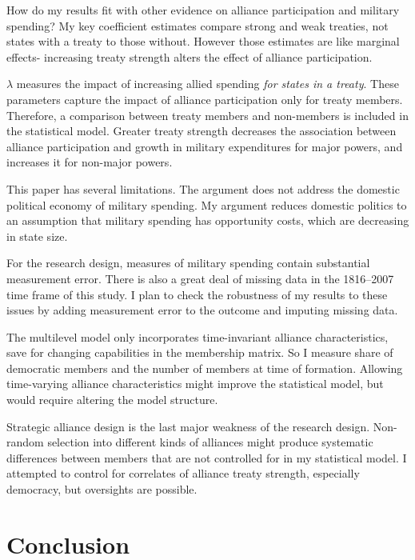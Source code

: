 \documentclass[12pt]{article}
\begin{document}
How do my results fit with other evidence on alliance participation and military spending? 
My key coefficient estimates compare strong and weak treaties, not states with a treaty to those without. 
However those estimates are like marginal effects- increasing treaty strength alters the effect of alliance participation.

 
$\lambda$ measures the impact of increasing allied spending \textit{for states in a treaty}. 
These parameters capture the impact of alliance participation only for treaty members. 
Therefore, a comparison between treaty members and non-members is included in the statistical model. 
Greater treaty strength decreases the association between alliance participation and growth in military expenditures for major powers, and increases it for non-major powers. 


This paper has several limitations.
The argument does not address the domestic political economy of military spending. 
My argument reduces domestic politics to an assumption that military spending has opportunity costs, which are decreasing in state size. 


For the research design, measures of military spending contain substantial measurement error. 
There is also a great deal of missing data in the 1816--2007 time frame of this study. 
I plan to check the robustness of my results to these issues by adding measurement error to the outcome and imputing missing data.


The multilevel model only incorporates time-invariant alliance characteristics, save for changing capabilities in the membership matrix. 
So I measure share of democratic members and the number of members at time of formation. 
Allowing time-varying alliance characteristics might improve the statistical model, but would require altering the model structure. 


Strategic alliance design is the last major weakness of the research design. 
Non-random selection into different kinds of alliances might produce systematic differences between members that are not controlled for in my statistical model. 
I attempted to control for correlates of alliance treaty strength, especially democracy, but oversights are possible. 



\section{Conclusion}
\end{document}
